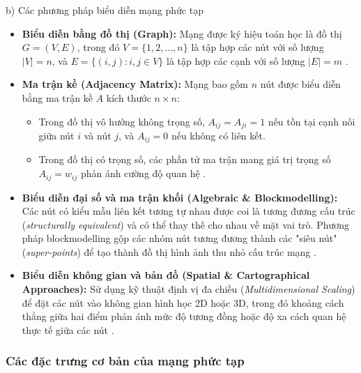 \documentclass[14pt,a4paper]{extarticle}
\begin{document}
\noindent b) Các phương pháp biểu diễn mạng phức tạp \\ \indent
\begin{itemize}
    \item \textbf{Biểu diễn bằng đồ thị (Graph):} Mạng được ký hiệu toán học là đồ thị $G = (V, E)$, trong đó $V = \{1, 2, \dots, n\}$ là tập hợp các nút với số lượng $|V| = n$, và $E = \{(i, j) : i, j \in V\}$ là tập hợp các cạnh với số lượng $|E| = m$ \cite{Traag2014}.
    
    \item \textbf{Ma trận kề (Adjacency Matrix):} Mạng bao gồm $n$ nút được biểu diễn bằng ma trận kề $A$ kích thước $n \times n$:
    \begin{itemize}
        \item Trong đồ thị vô hướng không trọng số, $A_{ij} = A_{ji} = 1$ nếu tồn tại cạnh nối giữa nút $i$ và nút $j$, và $A_{ij} = 0$ nếu không có liên kết.
        \item Trong đồ thị có trọng số, các phần tử ma trận mang giá trị trọng số $A_{ij} = w_{ij}$ phản ánh cường độ quan hệ \cite{Traag2014}.
    \end{itemize}
    
    \item \textbf{Biểu diễn đại số và ma trận khối (Algebraic \& Blockmodelling):} Các nút có kiểu mẫu liên kết tương tự nhau được coi là tương đương cấu trúc (\textit{structurally equivalent}) và có thể thay thế cho nhau về mặt vai trò. Phương pháp blockmodelling gộp các nhóm nút tương đương thành các "siêu nút" (\textit{super-points}) để tạo thành đồ thị hình ảnh thu nhỏ cấu trúc mạng \cite{Scott2012}.
    \item \textbf{Biểu diễn không gian và bản đồ (Spatial \& Cartographical Approaches):} Sử dụng kỹ thuật định vị đa chiều (\textit{Multidimensional Scaling}) để đặt các nút vào không gian hình học 2D hoặc 3D, trong đó khoảng cách thẳng giữa hai điểm phản ánh mức độ tương đồng hoặc độ xa cách quan hệ thực tế giữa các nút \cite{Scott2012}.
\end{itemize}

\subsubsection{Các đặc trưng cơ bản của mạng phức tạp}
\end{document}
